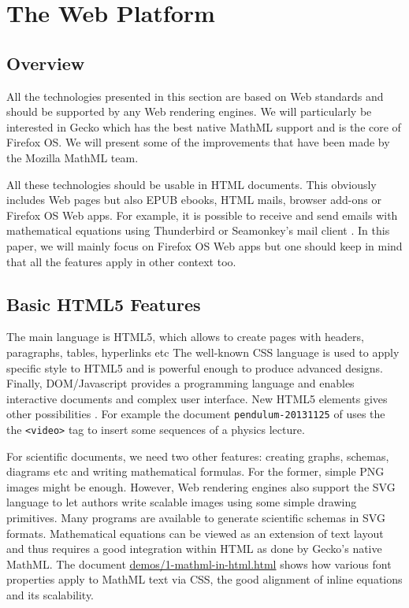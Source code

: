 \section{The Web Platform}

\subsection{Overview}

All the technologies presented in this section are based on Web standards and
should be supported by any Web rendering engines. We will particularly be
interested in Gecko which has the best native MathML support and is the core
of Firefox OS. We will present some of the improvements that have been made
by the Mozilla MathML team.

All these technologies should be usable in HTML documents. This obviously
includes Web pages but also EPUB ebooks, HTML mails, browser add-ons or
Firefox OS Web apps. For example, it is possible to receive and send emails
with mathematical equations using Thunderbird or Seamonkey's mail client
\cite{MathInEmails}.
In this paper, we will mainly
focus on Firefox OS Web apps but one should keep in mind that all the features
apply in other context too.

\subsection{Basic HTML5 Features}

The main language is HTML5, which allows to create pages with headers,
paragraphs, tables, hyperlinks etc The well-known CSS language is used to
apply specific style to HTML5 and is powerful enough to produce advanced
designs. Finally, DOM/Javascript provides a programming language and enables
interactive documents and complex user interface. New HTML5 elements
gives other possibilities . For example the document
{\tt pendulum-20131125} of \cite{MathInEbooks} uses the
the {\tt <video>} tag to insert some sequences of a physics lecture.

For scientific documents, we need two other features: creating graphs, schemas,
diagrams etc and writing mathematical formulas. For the former, simple PNG
images might be enough. However, Web rendering engines also support the SVG
language to let authors write scalable images using some simple drawing
primitives. Many programs are available to generate scientific schemas in SVG
formats. Mathematical equations can be viewed as an extension of text layout
and thus requires a good integration within HTML as done by
Gecko's native MathML. The document \href{http://fred-wang.github.io/MathUI2014/demos/1-mathml-in-html.html}{demos/1-mathml-in-html.html} shows how
various font properties apply to MathML text via CSS, the good alignment
of inline equations and its scalability.

